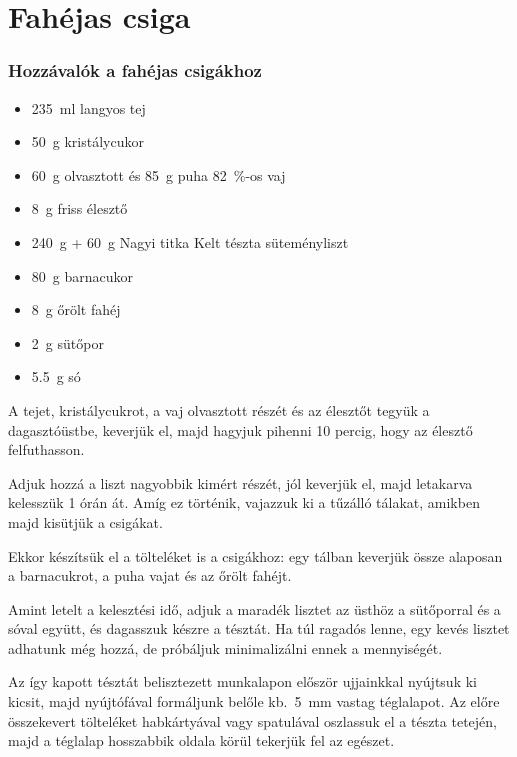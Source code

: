 \newpage
\section*{Fahéjas csiga} \label{sec:fahejas-csiga}

\subsubsection*{Hozzávalók a fahéjas csigákhoz}
\begin{itemize}
    \item \qty{235}{\ml} langyos tej
    \item \qty{50}{\g} kristálycukor
    \item \qty{60}{\g} olvasztott és \qty{85}{\g} puha \qty{82}{\percent}-os vaj
    \item \qty{8}{\g} friss élesztő
    \item \qty{240}{\g} + \qty{60}{\g} Nagyi titka Kelt tészta süteményliszt
    \item \qty{80}{\g} barnacukor
    \item \qty{8}{\g} őrölt fahéj
    \item \qty{2}{\g} sütőpor
    \item \qty{5.5}{\g} só
\end{itemize}

A tejet, kristálycukrot, a vaj olvasztott részét és az élesztőt tegyük a dagasztóüstbe, keverjük el, majd hagyjuk pihenni \num{10} percig, hogy az élesztő felfuthasson.

Adjuk hozzá a liszt nagyobbik kimért részét, jól keverjük el, majd letakarva kelesszük \num{1} órán át. Amíg ez történik, vajazzuk ki a tűzálló tálakat, amikben majd kisütjük a csigákat.

Ekkor készítsük el a tölteléket is a csigákhoz: egy tálban keverjük össze alaposan a barnacukrot, a puha vajat és az őrölt fahéjt.

Amint letelt a kelesztési idő, adjuk a maradék lisztet az üsthöz a sütőporral és a sóval együtt, és dagasszuk készre a tésztát. Ha túl ragadós lenne, egy kevés lisztet adhatunk még hozzá, de próbáljuk minimalizálni ennek a mennyiségét.

Az így kapott tésztát belisztezett munkalapon először ujjainkkal nyújtsuk ki kicsit, majd nyújtófával formáljunk belőle kb.~\qty{5}{\mm} vastag téglalapot. Az előre összekevert tölteléket habkártyával vagy spatulával oszlassuk el a tészta tetején, majd a téglalap hosszabbik oldala körül tekerjük fel az egészet.

